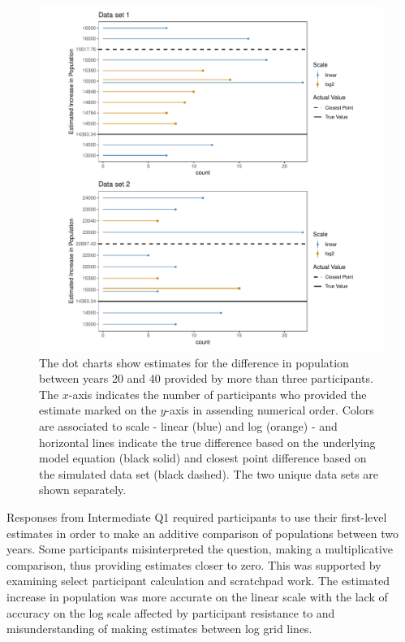 \documentclass[print]{nuthesis}
\begin{document}
\begin{figure}[tbp]

{\centering \includegraphics[width=1\linewidth,]{thesis_files/figure-latex/qi1-common-responses-1} 

}

\caption[Intermediate Q1 common responses]{The dot charts show estimates for the difference in population between years 20 and 40 provided by more than three participants. The $x$-axis indicates the number of participants who provided the estimate marked on the $y$-axis in assending numerical order. Colors are associated to scale - linear (blue) and log (orange) - and horizontal lines indicate the true difference based on the underlying model equation (black solid) and closest point difference based on the simulated data set (black dashed). The two unique data sets are shown separately.}\label{fig:qi1-common-responses}
\end{figure}

Responses from Intermediate Q1 required participants to use their first-level estimates in order to make an additive comparison of populations between two years.
Some participants misinterpreted the question, making a multiplicative comparison, thus providing estimates closer to zero.
This was supported by examining select participant calculation and scratchpad work.
The estimated increase in population was more accurate on the linear scale with the lack of accuracy on the log scale affected by participant resistance to and misunderstanding of making estimates between log grid lines.
\end{document}
